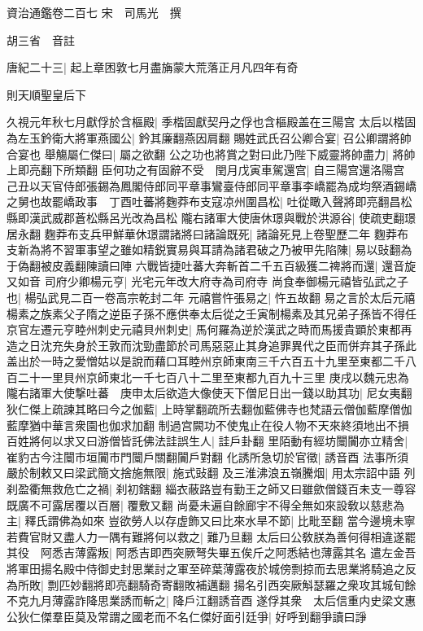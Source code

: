 資治通鑑卷二百七
宋　司馬光　撰

胡三省　音註

唐紀二十三|{
	起上章困敦七月盡㫋蒙大荒落正月凡四年有奇}


則天順聖皇后下

久視元年秋七月獻俘於含樞殿|{
	季楷固獻契丹之俘也含樞殿盖在三陽宫}
太后以楷固為左玉鈐衛大將軍燕國公|{
	鈐其廉翻燕因肩翻}
賜姓武氏召公卿合宴|{
	召公卿謂將帥合宴也}
舉觴屬仁傑曰|{
	屬之欲翻}
公之功也將賞之對曰此乃陛下威靈將帥盡力|{
	將帥上即亮翻下所類翻}
臣何功之有固辭不受　閏月戊寅車駕還宫|{
	自三陽宫還洛陽宫}
己丑以天官侍郎張錫為鳳閣侍郎同平章事鸞臺侍郎同平章事李嶠罷為成均祭酒錫嶠之舅也故罷嶠政事　丁酉吐蕃將麴莽布支寇凉州圍昌松|{
	吐從瞰入聲將即亮翻昌松縣即漢武威郡蒼松縣呂光改為昌松}
隴右諸軍大使唐休璟與戰於洪源谷|{
	使疏吏翻璟居永翻}
麴莽布支兵甲鮮華休璟謂諸將曰諸論既死|{
	諸論死見上卷聖歷二年}
麴莽布支新為將不習軍事望之雖如精鋭實易與耳請為諸君破之乃被甲先陷陳|{
	易以䜴翻為于偽翻被皮義翻陳讀曰陣}
六戰皆捷吐蕃大奔斬首二千五百級獲二禆將而還|{
	還音旋又如音}
司府少卿楊元亨|{
	光宅元年改大府寺為司府寺}
尚食奉御楊元禧皆弘武之子也|{
	楊弘武見二百一卷高宗乾封二年}
元禧嘗忤張易之|{
	忤五故翻}
易之言於太后元禧楊素之族素父子隋之逆臣子孫不應供奉太后從之壬寅制楊素及其兄弟子孫皆不得任京官左遷元亨睦州刺史元禧貝州刺史|{
	馬何羅為逆於漢武之時而馬援貴顕於東都再造之日沈充失身於王敦而沈勁盡節於司馬惡惡止其身追罪異代之臣而併弃其子孫此盖出於一時之愛憎姑以是說而藉口耳睦州京師東南三千六百五十九里至東都二千八百二十一里貝州京師東北一千七百八十二里至東都九百九十三里}
庚戌以魏元忠為隴右諸軍大使撃吐蕃　庚申太后欲造大像使天下僧尼日出一錢以助其功|{
	尼女夷翻}
狄仁傑上疏諫其略曰今之伽藍|{
	上時掌翻疏所去翻伽藍佛寺也梵語云僧伽藍摩僧伽藍摩猶中華言衆園也伽求加翻}
制過宫闕功不使鬼止在役人物不天來終須地出不損百姓將何以求又曰游僧皆託佛法詿誤生人|{
	詿戶卦翻}
里陌動有經坊闤闠亦立精舍|{
	崔豹古今注闤市垣闠市門闤戶關翻闠戶對翻}
化誘所急切於官徵|{
	誘音酉}
法事所須嚴於制敕又曰梁武簡文捨施無限|{
	施式䜴翻}
及三淮沸浪五嶺騰烟|{
	用太宗詔中語}
列刹盈衢無救危亡之禍|{
	刹初鎋翻}
緇衣蔽路豈有勤王之師又曰雖歛僧錢百未支一尊容既廣不可露居覆以百層|{
	覆敷又翻}
尚憂未遍自餘廊宇不得全無如來設敎以慈悲為主|{
	釋氏謂佛為如來}
豈欲勞人以存虚飾又曰比來水旱不節|{
	比毗至翻}
當今邊境未寧若費官財又盡人力一隅有難將何以救之|{
	難乃旦翻}
太后曰公敎朕為善何得相違遂罷其役　阿悉吉薄露叛|{
	阿悉吉即西突厥弩失畢五俟斤之阿悉結也薄露其名}
遣左金吾將軍田揚名殿中侍御史封思業討之軍至碎葉薄露夜於城傍剽掠而去思業將騎追之反為所敗|{
	剽匹妙翻將即亮翻騎奇寄翻敗補邁翻}
揚名引西突厥斛瑟羅之衆攻其城旬餘不克九月薄露詐降思業誘而斬之|{
	降戶江翻誘音酉}
遂俘其衆　太后信重内史梁文惠公狄仁傑羣臣莫及常謂之國老而不名仁傑好面引廷爭|{
	好呼到翻爭讀曰諍}
